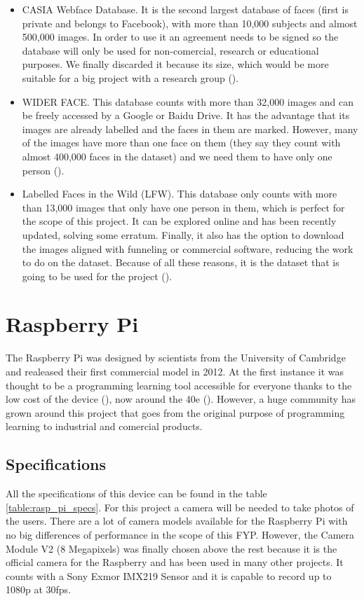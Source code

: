 \begin{itemize}
	\item CASIA Webface Database. It is the second largest database of faces (first is private and belongs to Facebook), with more than 10,000 subjects and almost 500,000 images. In order to use it an agreement needs to be signed so the database will only be used for non-comercial, research or educational purposes. We finally discarded it because its size, which would be more suitable for a big project with a research group (\cite{casia_db}). 
	\item WIDER FACE. This database counts with more than 32,000 images and can be freely accessed by a Google or Baidu Drive. It has the advantage that its images are already labelled and the faces in them are marked. However, many of the images have more than one face on them (they say they count with almost 400,000 faces in the dataset) and we need them to have only one person (\cite{widerf_db}).
	\item Labelled Faces in the Wild (LFW). This database only counts with more than 13,000 images that only have one person in them, which is perfect for the scope of this project. It can be explored online and has been recently updated, solving some erratum. Finally, it also has the option to download the images aligned with funneling or commercial software, reducing the work to do on the dataset. Because of all these reasons, it is the dataset that is going to be used for the project (\cite{lfw_db}).
\end{itemize}

\section{Raspberry Pi}	
The Raspberry Pi was designed by scientists from the University of Cambridge and realeased their first commercial model in 2012. At the first instance it was thought to be a programming learning tool accessible for everyone thanks to the low cost of the device (\cite{raspberry_pi_for_learning}), now around the 40e (\cite{price_raspberry_pi}). However, a huge community has grown around this project that goes from the original purpose of programming learning to industrial and comercial products.

	\subsection{Specifications}
	All the specifications of this device can be found in the table \ref{table:rasp_pi_specs}. For this project a camera will be needed to take photos of the users. There are a lot of camera models available for the Raspberry Pi with no big differences of performance in the scope of this FYP. However, the Camera Module V2 (8 Megapixels) was finally chosen above the rest because it is the official camera for the Raspberry and has been used in many other projects. It counts with a Sony Exmor IMX219 Sensor and it is capable to record up to 1080p at 30fps.



